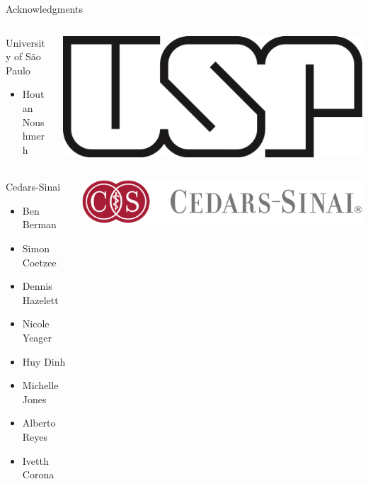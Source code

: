\documentclass[slidestop,compress,11pt,xcolor=dvipsnames]{beamer}
\begin{document}
\begin{frame}{Acknowledgments}
 \begin{columns}[T]
  \begin{column}{0.5\textwidth}
   \begin{block}{University of São Paulo}
    \begin{itemize}
     \item  Houtan Noushmerh
    \end{itemize}
   \end{block}
  \end{column}
  \begin{column}{0.5\textwidth}
   \vspace{0.2cm}
   \includegraphics[width=0.4\linewidth]{logo/usp.png}
  \end{column}
 \end{columns}

 \vspace{0.2cm}
 \begin{columns}[T]
  \begin{column}{0.5\textwidth}
   \begin{block}{Cedars-Sinai}
    \begin{itemize}
     \item Ben Berman
     \item Simon Coetzee
     \item Dennis Hazelett
     \item Nicole Yeager
     \item Huy Dinh
     \item Michelle Jones
     \item Alberto Reyes
     \item Ivetth Corona
    \end{itemize}
   \end{block}
  \end{column}
  \begin{column}{0.5\textwidth}
   \vspace{2.5cm}
   \includegraphics[width=1.0\linewidth]{cedars.png}
  \end{column}
 \end{columns}

\end{frame}
\end{document}
